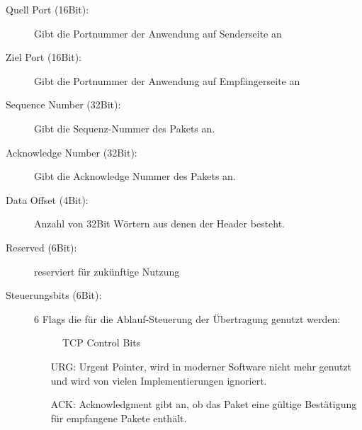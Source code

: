 \begin{description}

\item[Quell Port (16Bit): ] Gibt die Portnummer der Anwendung auf Senderseite an 
\item[Ziel Port (16Bit): ] Gibt die Portnummer der Anwendung auf Empfängerseite an
\item[Sequence Number (32Bit): ] Gibt die Sequenz-Nummer des Pakets an.
\item[Acknowledge Number (32Bit): ] Gibt die Acknowledge Nummer des Pakets an.
\item[Data Offset (4Bit): ] Anzahl von 32Bit Wörtern aus denen der Header besteht. 
\item[Reserved (6Bit): ] reserviert für zukünftige Nutzung
\item[Steuerungsbits (6Bit): ] 6 Flags die für die Ablauf-Steuerung der Übertragung genutzt werden: 
\begin{figure}[htp]
\centering
{}
\caption{TCP Control Bits}
\label{fig_ControlBits}
\end{figure}
\begin{itemize}
\item[URG: ] Urgent Pointer, wird in moderner Software nicht mehr genutzt und wird von vielen Implementierungen ignoriert. 
\item[ACK: ] Acknowledgment gibt an, ob das Paket eine gültige Bestätigung für empfangene Pakete enthält.

\end{itemize}
\end{description}
